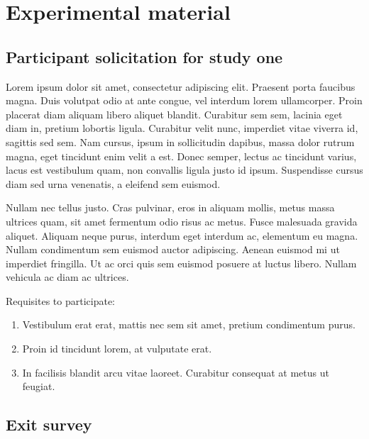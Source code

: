 \chapter{Experimental material}
\label{app:studyone}

\section{Participant solicitation for study one}
\label{app:studyone:solicitation}

Lorem ipsum dolor sit amet, consectetur adipiscing elit. Praesent porta faucibus magna. Duis volutpat odio at ante congue, vel interdum lorem ullamcorper. Proin placerat diam aliquam libero aliquet blandit. Curabitur sem sem, lacinia eget diam in, pretium lobortis ligula. Curabitur velit nunc, imperdiet vitae viverra id, sagittis sed sem. Nam cursus, ipsum in sollicitudin dapibus, massa dolor rutrum magna, eget tincidunt enim velit a est. Donec semper, lectus ac tincidunt varius, lacus est vestibulum quam, non convallis ligula justo id ipsum. Suspendisse cursus diam sed urna venenatis, a eleifend sem euismod.

Nullam nec tellus justo. Cras pulvinar, eros in aliquam mollis, metus massa ultrices quam, sit amet fermentum odio risus ac metus. Fusce malesuada gravida aliquet. Aliquam neque purus, interdum eget interdum ac, elementum eu magna. Nullam condimentum sem euismod auctor adipiscing. Aenean euismod mi ut imperdiet fringilla. Ut ac orci quis sem euismod posuere at luctus libero. Nullam vehicula ac diam ac ultrices.

\noindent Requisites to participate:
\begin{enumerate}
\item Vestibulum erat erat, mattis nec sem sit amet, pretium condimentum purus. 
\item Proin id tincidunt lorem, at vulputate erat.
\item In facilisis blandit arcu vitae laoreet. Curabitur consequat at metus ut feugiat.
\end{enumerate}

\section{Exit survey}
\label{app:studyone:gameform}

